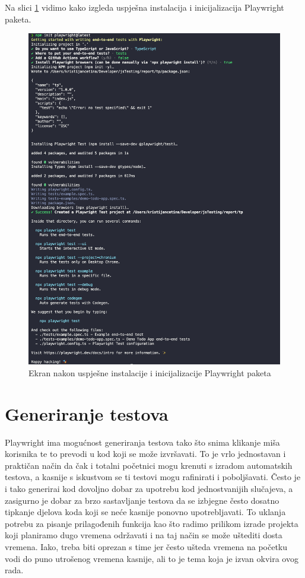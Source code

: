 Na slici \ref{img:pwInit} vidimo kako izgleda uspješna instalacija i inicijalizacija Playwright paketa.
\begin{figure}[!h]\begin{center}
    \includegraphics[width=1\textwidth]{"img/pwInit"}
    \caption{Ekran nakon uspješne instalacije i inicijalizacije Playwright paketa}\label{img:pwInit}
\end{center}\end{figure}
\section{Generiranje testova}
Playwright ima mogućnost generiranja testova tako što snima klikanje miša korisnika te to prevodi u kod koji se može izvršavati.
To je vrlo jednostavan i praktičan način da čak i totalni početnici mogu krenuti s izradom automatskih testova, a kasnije s iskustvom se ti testovi mogu rafinirati i poboljšavati.
Često je i tako generirai kod dovoljno dobar za upotrebu kod jednostvanijih slučajeva, a zasigurno je dobar za brzo sastavljanje testova da se izbjegne često dosatno tipkanje djelova koda koji se neće kasnije ponovno upotrebljavati.
To uklanja potrebu za pisanje prilagođenih funkcija kao što radimo prilikom izrade projekta koji planiramo dugo vremena održavati i na taj način se može uštediti dosta vremena.
Iako, treba biti oprezan s time jer često ušteda vremena na početku vodi do puno utrošenog vremena kasnije, ali to je tema koja je izvan okvira ovog rada.
